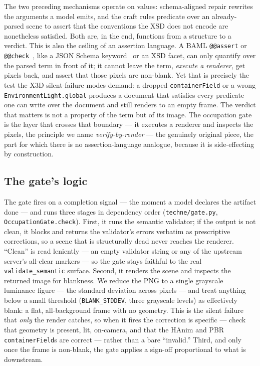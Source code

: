 \documentclass[sigconf,nonacm,screen,anonymous]{acmart}
\begin{document}
The two preceding mechanisms operate on values: schema-aligned repair rewrites the arguments a model emits, and the craft rules predicate over an already-parsed scene to assert that the conventions the XSD does not encode are nonetheless satisfied. Both are, in the end, functions from a structure to a verdict. This is also the ceiling of an assertion language. A BAML \texttt{@@assert} or \texttt{@@check}~\cite{baml}, like a JSON Schema keyword~\cite{jsonschema} or an XSD facet, can only quantify over the parsed term in front of it; it cannot leave the term, \emph{execute a renderer}, get pixels back, and assert that those pixels are non-blank. Yet that is precisely the test the X3D silent-failure modes demand: a dropped \texttt{containerField} or a wrong \texttt{EnvironmentLight.global} produces a document that satisfies every predicate one can write over the document and still renders to an empty frame. The verdict that matters is not a property of the term but of its image. The occupation gate is the layer that crosses that boundary --- it executes a renderer and inspects the pixels, the principle we name \emph{verify-by-render} --- the genuinely original piece, the part for which there is no assertion-language analogue, because it is side-effecting by construction.

\subsection{The gate's logic}

The gate fires on a completion signal --- the moment a model declares the artifact done --- and runs three stages in dependency order (\texttt{techne/gate.py}, \texttt{OccupationGate.check}). First, it runs the semantic validator; if the output is not clean, it blocks and returns the validator's errors verbatim as prescriptive corrections, so a scene that is structurally dead never reaches the renderer. ``Clean'' is read leniently --- an empty validator string or any of the upstream server's all-clear markers --- so the gate stays faithful to the real \texttt{validate\_semantic} surface. Second, it renders the scene and inspects the returned image for blankness. We reduce the PNG to a single grayscale luminance figure --- the standard deviation across pixels --- and treat anything below a small threshold (\texttt{BLANK\_STDDEV}, three grayscale levels) as effectively blank: a flat, all-background frame with no geometry. This is the silent failure that \emph{only} the render catches, so when it fires the correction is specific --- check that geometry is present, lit, on-camera, and that the HAnim and PBR \texttt{containerField}s are correct --- rather than a bare ``invalid.'' Third, and only once the frame is non-blank, the gate applies a sign-off proportional to what is downstream.
\end{document}
